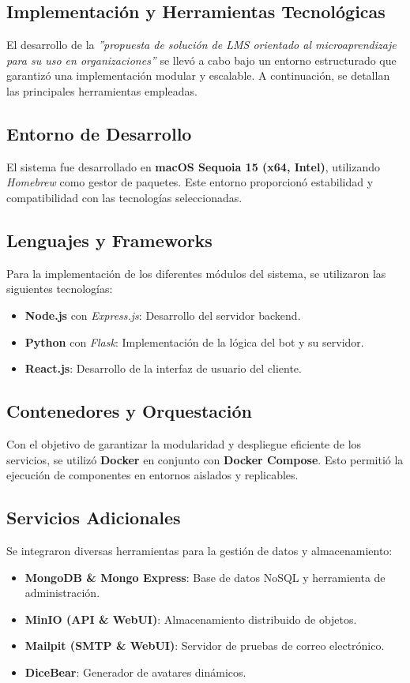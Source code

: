 \subsection{Implementación y Herramientas Tecnológicas}

El desarrollo de  la \textit{''propuesta de solución de LMS orientado al
microaprendizaje para su uso en organizaciones''} se llevó a cabo bajo un entorno
estructurado que garantizó una implementación modular y escalable. A
continuación, se detallan las principales herramientas empleadas.

\subsection{Entorno de Desarrollo}
El sistema fue desarrollado en \textbf{macOS Sequoia 15 (x64, Intel)},
utilizando \textit{Homebrew} como gestor de paquetes. Este entorno proporcionó
estabilidad y compatibilidad con las tecnologías seleccionadas.

\subsection{Lenguajes y Frameworks}
Para la implementación de los diferentes módulos del sistema, se utilizaron las
siguientes tecnologías:
\begin{itemize}
	\item \textbf{Node.js} con \textit{Express.js}: Desarrollo del servidor
	backend.
	\item \textbf{Python} con \textit{Flask}: Implementación de la lógica del
	bot y su servidor.
	\item \textbf{React.js}: Desarrollo de la interfaz de usuario del cliente.
\end{itemize}

\subsection{Contenedores y Orquestación}
Con el objetivo de garantizar la modularidad y despliegue eficiente de los
servicios, se utilizó \textbf{Docker} en conjunto con \textbf{Docker Compose}.
Esto permitió la ejecución de componentes en entornos aislados y replicables.

\subsection{Servicios Adicionales}
Se integraron diversas herramientas para la gestión de datos y almacenamiento:
\begin{itemize}
	\item \textbf{MongoDB \& Mongo Express}: Base de datos NoSQL y herramienta
	de administración.
	\item \textbf{MinIO (API \& WebUI)}: Almacenamiento distribuido de objetos.
	\item \textbf{Mailpit (SMTP \& WebUI)}: Servidor de pruebas de correo
	electrónico.
	\item \textbf{DiceBear}: Generador de avatares dinámicos.
\end{itemize}

